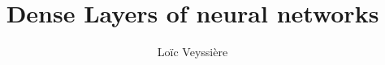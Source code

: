 \documentclass{article}
\begin{document}
\title{Dense Layers of neural networks}
\author{Loïc Veyssière}

\maketitle


\end{document}
